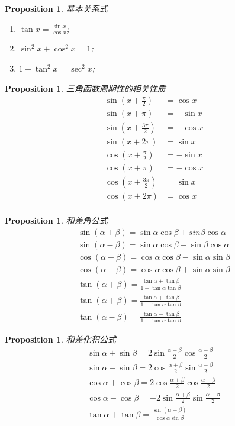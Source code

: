 \documentclass{article}
\newtheorem{proposition}[theorem]{Proposition}
\begin{document}
\begin{proposition}
\rm 基本关系式
\begin{enumerate}
	\item $\tan x = \frac{\sin x}{\cos x}$;
	\item $\sin^2 x + \cos^2 x =1$;
	\item $1 + \tan^2 x = \sec^2 x$;
\end{enumerate}
\end{proposition}

\begin{proposition}
\rm 三角函数周期性的相关性质
$$
\begin{array}{ll}
\sin (x+\frac{\pi}{2}) &= \cos x \\
\sin (x+\pi) &= -\sin x \\
\sin (x+\frac{3\pi}{2}) &= -\cos x \\
\sin (x+2\pi) &= \sin x \\
\cos (x+\frac{\pi}{2}) &= -\sin x \\
\cos (x+\pi) &= -\cos x \\
\cos (x+\frac{3\pi}{2}) &= \sin x \\
\cos (x+2\pi) &= \cos x \\
\end{array}
$$
\end{proposition}

\begin{proposition}
\rm 和差角公式
$$
\begin{array}{ll}
\sin(\alpha + \beta) = \sin \alpha \cos \beta + sin \beta \cos \alpha \\
\sin(\alpha - \beta) = \sin \alpha \cos \beta - \sin \beta \cos \alpha \\
\cos(\alpha + \beta) = \cos \alpha \cos \beta - \sin \alpha \sin \beta \\
\cos(\alpha - \beta) = \cos \alpha \cos \beta + \sin \alpha \sin \beta \\
\tan(\alpha + \beta) = \frac{\tan \alpha + \tan \beta}{1-\tan\alpha\tan\beta} \\ 
\tan(\alpha + \beta) = \frac{\tan \alpha + \tan \beta}{1-\tan\alpha\tan\beta} \\
\tan(\alpha - \beta) = \frac{\tan \alpha - \tan \beta}{1+\tan\alpha\tan\beta}
\end{array}
$$
\end{proposition}

\begin{proposition}
\rm 和差化积公式
$$
\begin{array}{ll}
\sin \alpha + \sin \beta = 2\sin\frac{\alpha + \beta}{2}\cos\frac{\alpha - \beta}{2} \\
\sin \alpha - \sin \beta = 2\cos\frac{\alpha + \beta}{2}\sin\frac{\alpha - \beta}{2} \\
\cos \alpha + \cos \beta = 2\cos\frac{\alpha + \beta}{2}\cos\frac{\alpha - \beta}{2} \\
\cos \alpha - \cos \beta = - 2\sin\frac{\alpha + \beta}{2}\sin\frac{\alpha - \beta}{2} \\
\tan \alpha + \tan \beta = \frac{\sin (\alpha + \beta)}{\cos \alpha \sin \beta} 
\end{array}
$$
\end{proposition}
\end{document}
